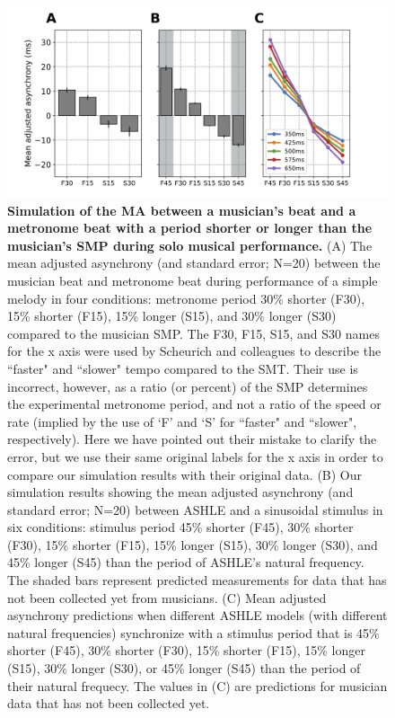 \documentclass{report}
\begin{document}
\begin{figure}
    \centering
    \includegraphics[width=1.0\textwidth]{figures/fig3_2.png}
    \caption[Simulation of the MA between a musician's beat and a metronome beat with a period shorter or longer than the musician's SMP during solo musical performance]{\textbf{Simulation of the MA between a musician's beat and a metronome beat with a period shorter or longer than the musician's SMP during solo musical performance.} (A) The mean adjusted asynchrony (and standard error; N=20) between the musician beat and metronome beat during performance of a simple melody in four conditions: metronome period 30\% shorter (F30), 15\% shorter (F15), 15\% longer (S15), and 30\% longer (S30) compared to the musician SMP. The F30, F15, S15, and S30 names for the x axis were used by Scheurich and colleagues \cite{scheurich2018tapping} to describe the ``faster" and ``slower" tempo compared to the SMT. Their use is incorrect, however, as a ratio (or percent) of the SMP determines the experimental metronome period, and not a ratio of the speed or rate (implied by the use of `F' and `S' for ``faster" and ``slower", respectively). Here we have pointed out their mistake to clarify the error, but we use their same original labels for the x axis in order to compare our simulation results with their original data. (B) Our simulation results showing the mean adjusted asynchrony (and standard error; N=20) between ASHLE and a sinusoidal stimulus in six conditions: stimulus period 45\% shorter (F45), 30\% shorter (F30), 15\% shorter (F15), 15\% longer (S15), 30\% longer (S30), and 45\% longer (S45) than the period of ASHLE's natural frequency. The shaded bars represent predicted measurements for data that has not been collected yet from musicians. (C) Mean adjusted asynchrony predictions when different ASHLE models (with different natural frequencies) synchronize with a stimulus period that is 45\% shorter (F45), 30\% shorter (F30), 15\% shorter (F15), 15\% longer (S15), 30\% longer (S30), or 45\% longer (S45) than the period of their natural frequecy. The values in (C) are predictions for musician data that has not been collected yet.}
    \label{f3_2}
\end{figure}
\end{document}
